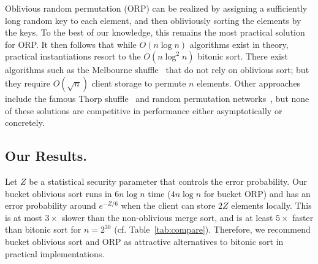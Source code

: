 Oblivious random permutation (ORP) can be realized by assigning a sufficiently long random key to each element, and then obliviously sorting the elements by the keys.
To the best of our knowledge, this remains the most practical solution for ORP.
It then follows that while $O(n \log n)$ algorithms exist in theory, practical instantiations resort to the $O(n \log^2 n)$ bitonic sort.
There exist algorithms such as the Melbourne
shuffle~\cite{ohrimenko2014melbourne} that do not rely on
oblivious sort; but they require $O(\sqrt{n})$ client storage to permute $n$ elements.
Other approaches include the famous Thorp shuffle~\cite{thorp01} and random permutation networks~\cite{randpermnet}, but none of these solutions are competitive in performance either asymptotically or concretely.

\subsection{Our Results.}
Let $Z$ be a statistical security parameter that controls the error probability. 
Our bucket oblivious sort runs in $6n\log n$ time ($4n\log n$ for bucket ORP) and has an error probability around $e^{-Z/6}$ when the client can store $2Z$ elements locally.
This is at most $3\times$ slower than the non-oblivious merge sort, and is at least $5\times$ faster than bitonic sort for $n=2^{30}$ (cf. Table~\ref{tab:compare}).
Therefore, we recommend bucket oblivious sort and ORP as attractive alternatives to bitonic sort in practical implementations.

